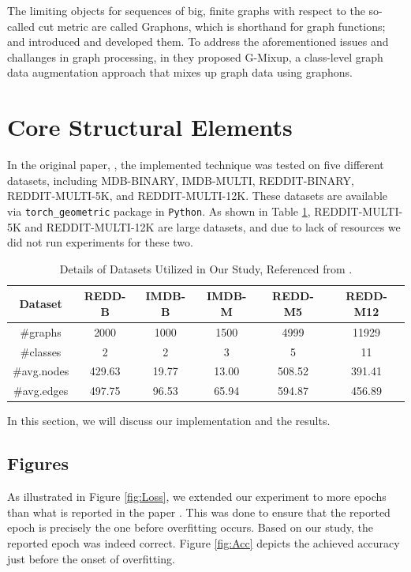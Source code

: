 \documentclass[sigconf, nonacm]{acmart}
\begin{document}
The limiting objects for sequences of big, finite graphs with respect to the so-called cut metric are called Graphons, which is shorthand for graph functions;
 \cite {borgs2008convergent} and \cite{borgs2012convergent} introduced and developed them. To address the aforementioned issues and challanges in graph processing, in \cite{han2022g} they proposed G-Mixup, a class-level graph data augmentation approach that mixes up graph data using graphons.

\section{Core Structural Elements}

In the original paper, \cite{han2022g}, the implemented technique was tested on five different datasets, including MDB-BINARY, IMDB-MULTI, REDDIT-BINARY, REDDIT-MULTI-5K, and REDDIT-MULTI-12K. These datasets are available via \texttt{torch\_geometric} package in \texttt{Python}. As shown in Table \ref{data}, REDDIT-MULTI-5K and REDDIT-MULTI-12K are large datasets, and due to lack of resources we did not run experiments for these two.

\begin{table}[t]
  \caption{Details of Datasets Utilized in Our Study, Referenced from \cite{han2022g}.}
  \label{data}
  \begin{tabular}{cccccc}
    \toprule
    Dataset & REDD-B & IMDB-B & IMDB-M & REDD-M5 & REDD-M12 \\
    \midrule
    \#graphs  & 2000 & 1000 & 1500 & 4999 & 11929\\
    \#classes  & 2 & 2 & 3 & 5 & 11\\
    \#avg.nodes  & 429.63 & 19.77 & 13.00 & 508.52 & 391.41\\
    \#avg.edges  & 497.75 & 96.53 & 65.94 & 594.87 & 456.89\\
    \bottomrule
  \end{tabular}
\end{table}

In this section, we will discuss our implementation and the results.

\subsection{Figures}

As illustrated in Figure \ref{fig:Loss}, we extended our experiment to more epochs than what is reported in the paper \cite{han2022g}. This was done to ensure that the reported epoch is precisely the one before overfitting occurs. Based on our study, the reported epoch was indeed correct. Figure \ref{fig:Acc} depicts the achieved accuracy just before the onset of overfitting.
\end{document}
